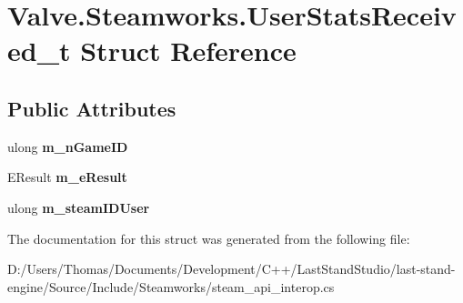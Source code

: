 \hypertarget{structValve_1_1Steamworks_1_1UserStatsReceived__t}{}\section{Valve.\+Steamworks.\+User\+Stats\+Received\+\_\+t Struct Reference}
\label{structValve_1_1Steamworks_1_1UserStatsReceived__t}
\subsection*{Public Attributes}
\begin{DoxyCompactItemize}
\item 
\hypertarget{structValve_1_1Steamworks_1_1UserStatsReceived__t_acc97f1f636e8fd9a239d507b3b9658e3}{}ulong {\bfseries m\+\_\+n\+Game\+I\+D}\label{structValve_1_1Steamworks_1_1UserStatsReceived__t_acc97f1f636e8fd9a239d507b3b9658e3}

\item 
\hypertarget{structValve_1_1Steamworks_1_1UserStatsReceived__t_a5f52a90b5cfce390caaef5d5ebb677c7}{}E\+Result {\bfseries m\+\_\+e\+Result}\label{structValve_1_1Steamworks_1_1UserStatsReceived__t_a5f52a90b5cfce390caaef5d5ebb677c7}

\item 
\hypertarget{structValve_1_1Steamworks_1_1UserStatsReceived__t_ae03f7ab927b762878032c1c751237916}{}ulong {\bfseries m\+\_\+steam\+I\+D\+User}\label{structValve_1_1Steamworks_1_1UserStatsReceived__t_ae03f7ab927b762878032c1c751237916}

\end{DoxyCompactItemize}


The documentation for this struct was generated from the following file\+:\begin{DoxyCompactItemize}
\item 
D\+:/\+Users/\+Thomas/\+Documents/\+Development/\+C++/\+Last\+Stand\+Studio/last-\/stand-\/engine/\+Source/\+Include/\+Steamworks/steam\+\_\+api\+\_\+interop.\+cs\end{DoxyCompactItemize}
